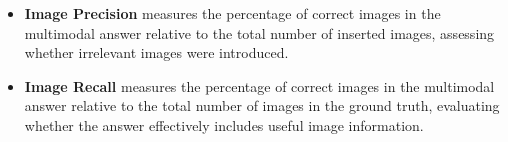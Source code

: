\begin{itemize}
    \item 
    \textbf{Image Precision} measures the percentage of correct images in the multimodal answer relative to the total number of inserted images, assessing whether irrelevant images were introduced. 

    \item 
    \textbf{Image Recall} measures the percentage of correct images in the multimodal answer relative to the total number of images in the ground truth, evaluating whether the answer effectively includes useful image information. 


\end{itemize}
